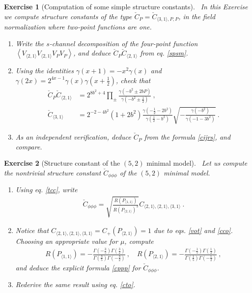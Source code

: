 \documentclass[12pt, a4paper, notitlepage, twoside]{report}
\numberwithin{equation}{section}
\theoremstyle{break}
\newtheorem{exo}{Exercise}[chapter]
\begin{document}
\begin{exo}[Computation of some simple structure constants]
 ~\label{exosssc}
 In this Exercise we compute structure constants of the type $\check{C}_P = \check{C}_{\langle 3,1\rangle, P,P}$, in the field normalization where two-point functions are one. 
\begin{enumerate}
\item Write the $s$-channel decomposition of the four-point function $\left< V_{\langle 2,1\rangle} V_{\langle 2,1\rangle} V_PV_P\right>$, and deduce $\check{C}_P \check{C}_{\langle 2,1\rangle}$ from eq. \eqref{spsm}.
\item Using the identities $\gamma(x+1)=-x^2\gamma(x)$ and $\gamma(2x)= 2^{4x-1}\gamma(x)\gamma(x+\tfrac12)$, check that
\begin{align}
 \check{C}_P \check{C}_{\langle 2,1\rangle} &= 2^{8b^2+4} \prod_\pm \frac{\gamma(-b^2\pm 2bP)}{\gamma(-b^2\pm \frac12)} \ ,
 \\
 \check{C}_{\langle 3,1\rangle} &= 2^{-2-4b^2}(1+2b^2)\frac{\gamma(-\tfrac12-2b^2)}{\gamma(\tfrac12-b^2)}\sqrt{-\frac{\gamma(-b^2)}{\gamma(-1-3b^2)}}\ .
 \label{cto}
\end{align}
 \item As an independent verification, deduce $\check{C}_P$ from the formula \eqref{cijrs}, and compare.
\end{enumerate}
\end{exo}


\begin{exo}[Structure constant of the $(5,2)$ minimal model]
 ~\label{exocppp}
 Let us compute the nontrivial structure constant $\check{C}_{\phi\phi\phi}$ of the $(5,2)$ minimal model.
 \begin{enumerate}
  \item Using eq. \eqref{tcc}, write
\begin{align}
 \check{C}_{\phi\phi\phi} = \sqrt{\frac{R(P_{\langle 1,1 \rangle})}{R(P_{\langle 2,1 \rangle})^3}} C_{\langle 2,1\rangle , \langle 2,1 \rangle,\langle 3,1 \rangle}\ .
\end{align}
\item Notice that $C_{\langle 2,1\rangle , \langle 2,1 \rangle,\langle 3,1 \rangle} = C_+(P_{\langle 2,1 \rangle})=1$ due to eqs. \eqref{vot} and \eqref{cco}.
Choosing an appropriate value for $\mu$, compute
\begin{align}
 R(P_{\langle 1,1 \rangle}) = -\frac{\Gamma(-\frac35)\Gamma(\frac32)}{\Gamma(\frac35)\Gamma(-\frac32)} \ , \quad R(P_{\langle 2,1 \rangle}) = -\frac{\Gamma(-\frac15)\Gamma(\frac12)}{\Gamma(\frac15)\Gamma(-\frac12)}\ , 
\end{align}
and deduce the explicit formula \eqref{cppp} for $\check{C}_{\phi\phi\phi}$.
\item Rederive the same result using eq. \eqref{cto}.
 \end{enumerate}


\end{exo}
\end{document}
